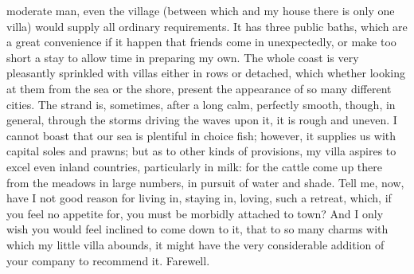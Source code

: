 moderate man, even the village (between which and my house there is only
one villa) would supply all ordinary requirements. It has three public
baths, which are a great convenience if it happen that friends come in
unexpectedly, or make too short a stay to allow time in preparing my own.
The whole coast is very pleasantly sprinkled with villas either in rows or
detached, which whether looking at them from the sea or the shore, present
the appearance of so many different cities. The strand is, sometimes,
after a long calm, perfectly smooth, though, in general, through the
storms driving the waves upon it, it is rough and uneven. I cannot boast
that our sea is plentiful in choice fish; however, it supplies us with
capital soles and prawns; but as to other kinds of provisions, my villa
aspires to excel even inland countries, particularly in milk: for the
cattle come up there from the meadows in large numbers, in pursuit of
water and shade. Tell me, now, have I not good reason for living in,
staying in, loving, such a retreat, which, if you feel no appetite for,
you must be morbidly attached to town? And I only wish you would feel
inclined to come down to it, that to so many charms with which my little
villa abounds, it might have the very considerable addition of your
company to recommend it. Farewell.


